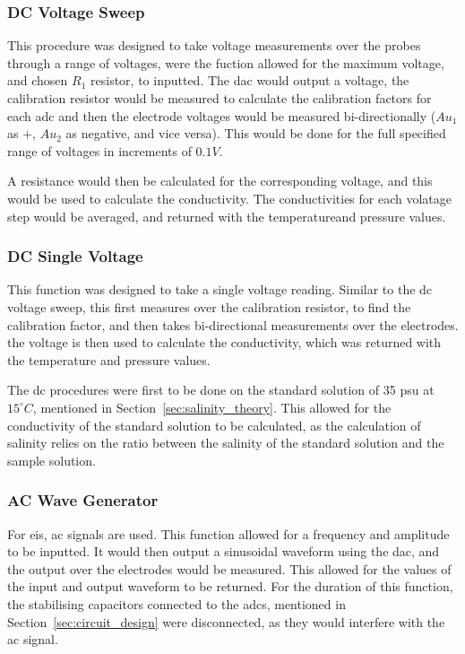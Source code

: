 \subsubsection{DC Voltage Sweep}
This procedure was designed to take voltage measurements over the probes through a range of voltages, were the fuction allowed for the maximum voltage, and chosen $R_1$ resistor, to inputted.
The \gls{dac} would output a voltage, the calibration resistor would be measured to calculate the calibration factors for each \gls{adc} and then the electrode voltages would be measured bi-directionally ($Au_1$ as +, $Au_2$ as negative, and vice versa).
This would be done for the full specified range of voltages in increments of $0.1V$.

A resistance would then be calculated for the corresponding voltage, and this would be used to calculate the conductivity.
The conductivities for each volatage step would be averaged, and returned with the temperatureand pressure values.

\subsubsection{DC Single Voltage}
This function was designed to take a single voltage reading.
Similar to the \gls{dc} voltage sweep, this first measures over the calibration resistor, to find the calibration factor, and then takes bi-directional measurements over the electrodes.
the voltage is then used to calculate the conductivity, which was returned with the temperature and pressure values.

The \gls{dc} procedures were first to be done on the standard solution of 35 \gls{psu} at $15^{\circ}C$, mentioned in Section~\ref{sec:salinity_theory}.
This allowed for the conductivity of the standard solution to be calculated, as the calculation of salinity relies on the ratio between the salinity of the standard solution and the sample solution.

\subsubsection{AC Wave Generator}
For \gls{eis}, \gls{ac} signals are used. This function allowed for a frequency and amplitude to be inputted.
It would then output a sinusoidal waveform using the \gls{dac}, and the output over the electrodes would be measured.
This allowed for the values of the input and output waveform to be returned.
For the duration of this function, the stabilising capacitors connected to the \gls{adc}s, mentioned in Section~\ref{sec:circuit_design} were disconnected, as they would interfere with the \gls{ac} signal.

